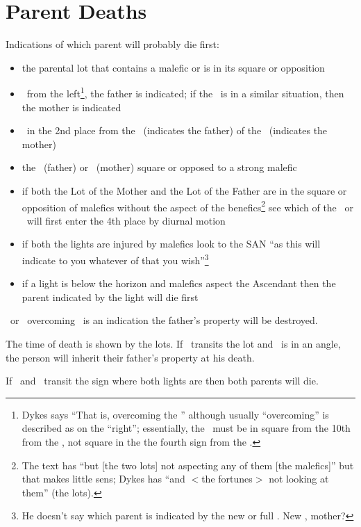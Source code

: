 \section{Parent Deaths}

Indications of which parent will probably die first:
\begin{itemize}[topsep=0em,itemsep=0em]
\item the parental lot that contains a malefic or is in its square or opposition

\item \Mars\Square\Sun\, from the left\footnote{Dykes says ``That is, overcoming the \Sun'' although usually ``overcoming'' is described as on the ``right''; essentially, the \Mars\, must be in square from the 10th from the \Sun, not square in the the fourth sign from the \Sun.}, the father is indicated; if the \Moon\, is in a similar situation, then the mother is indicated

\item \Mars\, in the 2nd place from the \Sun\, (indicates the father) of the \Moon\, (indicates the mother)

\item the \Sun\, (father) or \Moon\, (mother) square or opposed to a strong malefic

\item if both the Lot of the Mother and the Lot of the Father are in the square or opposition of malefics without the aspect of the benefics\footnote{The text has ``but [the two lots] not aspecting any of them [the malefics]'' but that makes little sens; Dykes has ``and $<$the fortunes$>$ not looking at them'' (the lots).} see which of the \Sun\, or \Moon\, will first enter the 4th place by diurnal motion

\item if both the lights are injured by malefics look to the SAN ``as this will indicate to you whatever of that you wish''\footnote{He doesn't say which parent is indicated by the new or full \Moon.  New \Moon, mother?}

\item if a light is below the horizon and malefics aspect the Ascendant then the parent indicated by the light will die first
\end{itemize}

\Saturn\Opposition\Mars\, or \Mars\, overcoming \Saturn\,  is an indication the father's property will be destroyed.

The time of death is shown by the lots. If \Saturn\, transits the lot and \Jupiter\, is in an angle, the person will inherit their father's property at his death.

If \Saturn\, and \Mars\, transit the sign where both lights are then both parents will die.